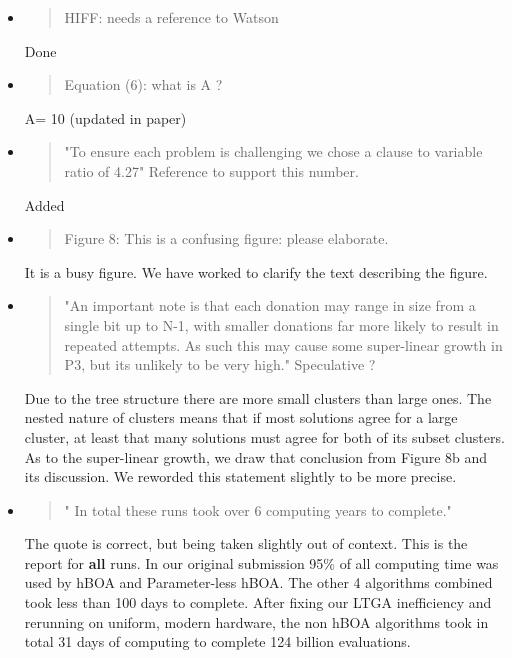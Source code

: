 \documentclass[]{article}
\begin{document}
\begin{itemize}
\item
\begin{quote}
HIFF: needs a reference to Watson
\end{quote}

Done

\item
\begin{quote}
Equation (6): what is A ?
\end{quote}

A= 10 (updated in paper)

\item
\begin{quote}
"To ensure each problem is challenging we chose a clause to variable ratio of 4.27"
Reference to support this number.
\end{quote}

Added 

\item
\begin{quote}
Figure 8: This is a confusing figure: please elaborate.
\end{quote}

It is a busy figure. We have worked to clarify the text describing the figure.

\item
\begin{quote}
 "An important note is that each donation may range in size from a single bit up to N-1, with smaller donations far more likely to result in repeated attempts. As such this may cause some super-linear growth in P3, but its unlikely to be very high."
Speculative ?
\end{quote}

Due to the tree structure there are more small clusters than large ones. The nested nature of clusters means that if most solutions agree for a large cluster, at least that many solutions must agree for both of its subset clusters. As to the super-linear growth, we draw that conclusion from Figure 8b and its discussion. We reworded this statement slightly to be more precise.

\item
\begin{quote}
" In total these runs took over 6 computing years to complete."
\end{quote}

The quote is correct, but being taken slightly out of context. This is the report for \textbf{all} runs. In our original submission 95\% of all computing time was used by hBOA and Parameter-less hBOA. The other 4 algorithms combined took less than 100 days to complete. After fixing our LTGA inefficiency and rerunning on uniform, modern hardware, the non hBOA algorithms took in total 31 days of computing to complete 124 billion evaluations.


\end{itemize}
\end{document}
